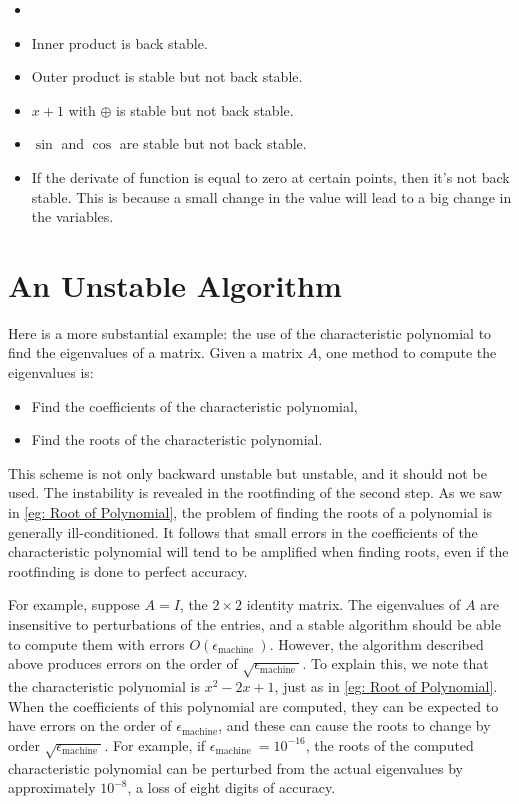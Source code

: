 \begin{example}
\label{eg: Stability}
\begin{itemize}
    \item []
    \item Inner product is back stable. 
    \item Outer product is stable but not back stable. 
    \item $x+1$ with $\oplus$ is stable but not back stable. 
    \item $\sin$ and $\cos$ are stable but not back stable. 
    \item If the derivate of function is equal to zero at certain points, then it's not back stable. This is because a small change in the value will lead to a big change in the variables. 
\end{itemize}

\end{example}


\section{An Unstable Algorithm}
Here is a more substantial example: the use of the characteristic polynomial to find the eigenvalues of a matrix. Given a matrix $A$, one method to compute the eigenvalues is: 
\begin{itemize}
    \item Find the coefficients of the characteristic polynomial, 
    \item Find the roots of the characteristic polynomial. 
\end{itemize}

This scheme is not only backward unstable but unstable, and it should not be used. The instability is revealed in the rootfinding of the second step. As we saw in \autoref{eg: Root of Polynomial}, the problem of finding the roots of a polynomial is generally ill-conditioned.  It follows that small errors in the coefficients of the characteristic polynomial will tend to be amplified when finding roots, even if the rootfinding is done to perfect accuracy. 

For example, suppose $A=I$, the $2 \times 2$ identity matrix. The eigenvalues of $A$ are insensitive to perturbations of the entries, and a stable algorithm should be able to compute them with errors $O\left(\epsilon_{\text {machine }}\right)$. However, the algorithm described above produces errors on the order of $\sqrt{\epsilon_{\text {machine }}}$. To explain this, we note that the characteristic polynomial is $x^2-2 x+1$, just as in \autoref{eg: Root of Polynomial}. When the coefficients of this polynomial are computed, they can be expected to have errors on the order of $\epsilon_{\text {machine}}$, and these can cause the roots to change by order $\sqrt{\epsilon_{\text {machine }}}$. For example, if $\epsilon_{\text {machine }}=10^{-16}$, the roots of the computed characteristic polynomial can be perturbed from the actual eigenvalues by approximately $10^{-8}$, a loss of eight digits of accuracy.

